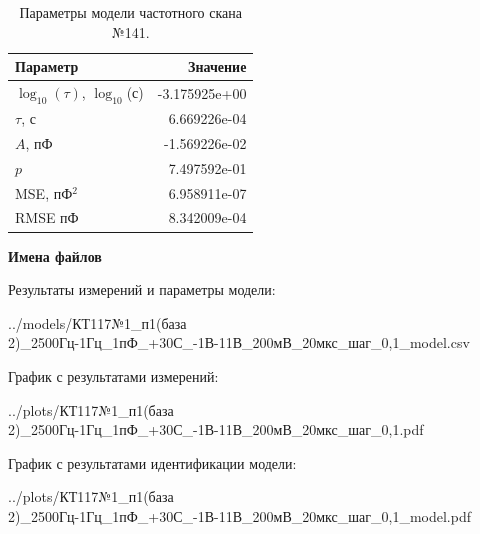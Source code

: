 \begin{table}[!ht]
    \centering
    \caption{Параметры модели частотного скана №141.}
    \begin{tabular}{|l|r|}
        \hline
        Параметр                                       & Значение                  \\ \hline
        $\log_{10}(\tau)$, $\log_{10}$(с)              & -3.175925e+00             \\ \hline
        $\tau$, с                                      & 6.669226e-04              \\ \hline
        $A$, пФ                                        & -1.569226e-02             \\ \hline
        $p$                                            & 7.497592e-01              \\ \hline
        MSE, пФ$^2$                                    & 6.958911e-07              \\ \hline
        RMSE пФ                                        & 8.342009e-04              \\ \hline
    \end{tabular}
    \label{table:frequency_scan_model_141}
\end{table}

\textbf{Имена файлов}

Результаты измерений и параметры модели:

\scriptsize../models/КТ117№1\_п1(база 2)\_2500Гц-1Гц\_1пФ\_+30С\_-1В-11В\_200мВ\_20мкс\_шаг\_0,1\_model.csv
\normalsize

График с результатами измерений:

\scriptsize../plots/КТ117№1\_п1(база 2)\_2500Гц-1Гц\_1пФ\_+30С\_-1В-11В\_200мВ\_20мкс\_шаг\_0,1.pdf
\normalsize

График с результатами идентификации модели:

\scriptsize../plots/КТ117№1\_п1(база 2)\_2500Гц-1Гц\_1пФ\_+30С\_-1В-11В\_200мВ\_20мкс\_шаг\_0,1\_model.pdf
\normalsize

